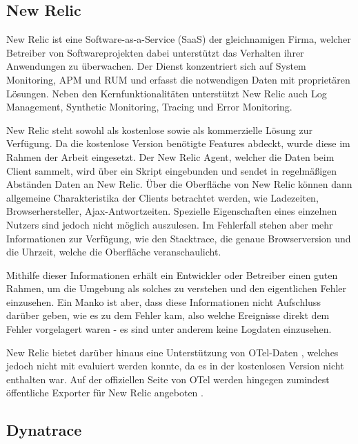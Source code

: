 \subsection{New Relic}

New Relic \cite{NewRelic} ist eine Software-as-a-Service (SaaS) der gleichnamigen Firma, welcher Betreiber von Softwareprojekten dabei unterstützt das Verhalten ihrer Anwendungen zu überwachen. Der Dienst konzentriert sich auf System Monitoring, APM und RUM und erfasst die notwendigen Daten mit proprietären Lösungen. Neben den Kernfunktionalitäten unterstützt New Relic auch Log Management, Synthetic Monitoring, Tracing und Error Monitoring.


New Relic steht sowohl als kostenlose sowie als kommerzielle Lösung zur Verfügung. Da die kostenlose Version benötigte Features abdeckt, wurde diese im Rahmen der Arbeit eingesetzt. Der New Relic Agent, welcher die Daten beim Client sammelt, wird über ein Skript eingebunden und sendet in regelmäßigen Abständen Daten an New Relic. Über die Oberfläche von New Relic können dann allgemeine Charakteristika der Clients betrachtet werden, wie Ladezeiten, Browserhersteller, Ajax-Antwortzeiten. Spezielle Eigenschaften eines einzelnen Nutzers sind jedoch nicht möglich auszulesen. Im Fehlerfall stehen aber mehr Informationen zur Verfügung, wie den Stacktrace, die genaue Browserversion und die Uhrzeit, welche die Oberfläche veranschaulicht.

Mithilfe dieser Informationen erhält ein Entwickler oder Betreiber einen guten Rahmen, um die Umgebung als solches zu verstehen und den eigentlichen Fehler einzusehen. Ein Manko ist aber, dass diese Informationen nicht Aufschluss darüber geben, wie es zu dem Fehler kam, also welche Ereignisse direkt dem Fehler vorgelagert waren - es sind unter anderem keine Logdaten einzusehen.

New Relic bietet darüber hinaus eine Unterstützung von OTel-Daten  \cite{NewRelicAnnoundOTelBetaSupport}, welches jedoch nicht mit evaluiert werden konnte, da es in der kostenlosen Version nicht enthalten war. Auf der offiziellen Seite von OTel werden hingegen zumindest öffentliche Exporter für New Relic angeboten \cite{OpenTelemetryRegistry}.

\subsection{Dynatrace}

